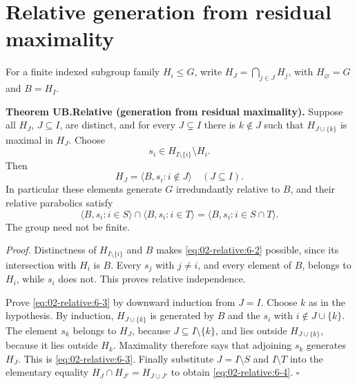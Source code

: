 \section{Relative generation from residual maximality}
For a finite indexed subgroup family \(H_i\leq G\), write \(H_J=\bigcap_{j\in J}H_j\), with \(H_\varnothing=G\) and \(B=H_I\).

\textbf{Theorem UB.Relative (generation from residual maximality).} Suppose all \(H_J\), \(J\subseteq I\), are distinct, and for every \(J\subsetneq I\) there is \(k\notin J\) such that \(H_{J\cup\{k\}}\) is maximal in \(H_J\). Choose \begin{equation}
s_i\in H_{I\setminus\{i\}}\setminus H_i.
\label{eq:02-relative:6-2}
\end{equation} Then \begin{equation}
H_J=\langle B,s_i:i\notin J\rangle\quad(J\subseteq I).
\label{eq:02-relative:6-3}
\end{equation} In particular these elements generate \(G\) irredundantly relative to \(B\), and their relative parabolics satisfy \begin{equation}
\langle B,s_i:i\in S\rangle\cap\langle B,s_i:i\in T\rangle
=\langle B,s_i:i\in S\cap T\rangle.
\label{eq:02-relative:6-4}
\end{equation} The group need not be finite.

\emph{Proof.} Distinctness of \(H_{I\setminus\{i\}}\) and \(B\) makes \eqref{eq:02-relative:6-2} possible, since its intersection with \(H_i\) is \(B\). Every \(s_j\) with \(j\ne i\), and every element of \(B\), belongs to \(H_i\), while \(s_i\) does not. This proves relative independence.

Prove \eqref{eq:02-relative:6-3} by downward induction from \(J=I\). Choose \(k\) as in the hypothesis. By induction, \(H_{J\cup\{k\}}\) is generated by \(B\) and the \(s_i\) with \(i\notin J\cup\{k\}\). The element \(s_k\) belongs to \(H_J\), because \(J\subseteq I\setminus\{k\}\), and lies outside \(H_{J\cup\{k\}}\), because it lies outside \(H_k\). Maximality therefore says that adjoining \(s_k\) generates \(H_J\). This is \eqref{eq:02-relative:6-3}. Finally substitute \(J=I\setminus S\) and \(I\setminus T\) into the elementary equality \(H_J\cap H_{J'}=H_{J\cup J'}\) to obtain \eqref{eq:02-relative:6-4}. \(\square\)

